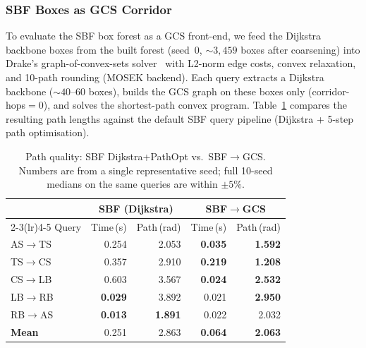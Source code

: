 \documentclass[journal]{IEEEtran}
\begin{document}

\subsubsection*{SBF Boxes as GCS Corridor}\label{sec:exp_gcs_corridor}

To evaluate the SBF box forest as a GCS front-end,
we feed the Dijkstra backbone boxes from
the built forest (seed~0, ${\sim}3{,}459$ boxes after coarsening)
into Drake's graph-of-convex-sets solver~\cite{marcucci2024motion}
with L2-norm edge costs, convex relaxation, and 10-path rounding
(MOSEK backend).
Each query extracts a Dijkstra backbone (${\sim}40$--60 boxes),
builds the GCS graph on these boxes only (corridor-hops${}=0$),
and solves the shortest-path convex program.
Table~\ref{tab:gcs_corridor} compares the resulting path lengths
against the default SBF query pipeline (Dijkstra + 5-step path optimisation).

\begin{table}[ht]
\centering
\caption{Path quality: SBF Dijkstra+PathOpt vs.\ SBF$\to$GCS. Numbers
are from a single representative seed; full 10-seed medians on the same
queries are within $\pm 5\%$.}
\label{tab:gcs_corridor}
\begin{tabular}{@{}l rr rr@{}}
\toprule
 & \multicolumn{2}{c}{\textbf{SBF (Dijkstra)}}
 & \multicolumn{2}{c}{\textbf{SBF$\to$GCS}} \\
\cmidrule(lr){2-3}\cmidrule(lr){4-5}
Query & Time\,(s) & Path\,(rad) & Time\,(s) & Path\,(rad) \\
\midrule
AS$\to$TS & 0.254 & 2.053 & \textbf{0.035} & \textbf{1.592} \\
TS$\to$CS & 0.357 & 2.910 & \textbf{0.219} & \textbf{1.208} \\
CS$\to$LB & 0.603 & 3.567 & \textbf{0.024} & \textbf{2.532} \\
LB$\to$RB & \textbf{0.029} & 3.892 & 0.021 & \textbf{2.950} \\
RB$\to$AS & \textbf{0.013} & \textbf{1.891} & 0.022 & 2.032 \\
\midrule
\textbf{Mean} & 0.251 & 2.863 & \textbf{0.064} & \textbf{2.063} \\
\bottomrule
\end{tabular}
\end{table}
\end{document}
